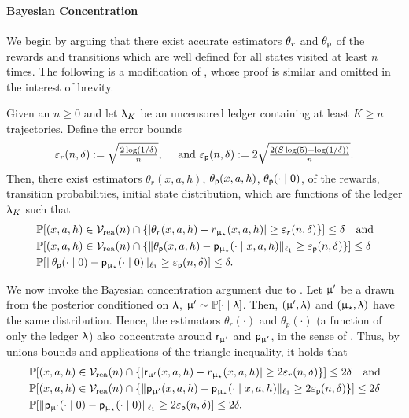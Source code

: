 \paragraph{Bayesian Concentration}
We begin by arguing that there exist accurate estimators $\theta_r$ and $\theta_{\mathsf{p}}$ of the rewards and transitions which are well defined for all states visited at least $n$ times. The following is a modification of , whose proof is similar and omitted in the interest of brevity.
\begin{lemma}\label{lem:conc_bounds_two} Given an $n \ge 0$ and let $\uplambda_K$ be an uncensored ledger containing at least $K \ge n$ trajectories. Define the error bounds
\begin{align*}
\textstyle \varepsilon_{r}(n,\delta) := \sqrt{ \frac{2\log(1/\delta)}{n}}, \quad \text{ and } \varepsilon_{\mathsf{p}}(n,\delta):= 2\sqrt{ \frac{2(S\log(5) + \log(1/\delta))}{n}}.
\end{align*}
Then, there exist estimators $\theta_r(x,a,h)$, $\theta_{\mathsf{p}}(x,a,h)$, $\theta_{\mathsf{p}}(\cdot \mid 0)$,  of the rewards,  transition probabilities, initial state distribution, which are functions of the ledger $\uplambda_K$  such that
\begin{align*}
&\operatorname{\mathbb{P}}[(x,a,h) \in \mathcal{V}_{\mathrm{rea}}(n) \cap \{|\theta_r(x,a,h) - r_{\upmu_{\star}}(x,a,h)| \ge \varepsilon_{r}(n,\delta)\} ] \le \delta \quad \text{and}\\
&\operatorname{\mathbb{P}}[(x,a,h) \in \mathcal{V}_{\mathrm{rea}}(n) \cap \{\|\theta_{\mathsf{p}}(x,a,h) - \mathsf{p}_{\upmu_{\star}}(\cdot \mid x,a,h)\|_{\ell_1} \ge \varepsilon_{\mathsf{p}}(n,\delta)\} ] \le \delta\\
&\operatorname{\mathbb{P}}[\|\theta_{\mathsf{p}}(\cdot \mid 0) - \mathsf{p}_{\upmu_{\star}}(\cdot \mid 0)\|_{\ell_1} \ge \varepsilon_{\mathsf{p}}(n,\delta)] \le \delta.
\end{align*}
\end{lemma}
We now invoke the Bayesian concentration argument due to \cite{Selke-PoIE-ec21}. Let $\upmu'$ be a drawn from the posterior conditioned on $\uplambda$, $\upmu' \sim \operatorname{\mathbb{P}}[\cdot \mid \uplambda]$. Then, $(\upmu',\uplambda)$ and $(\upmu_{\star},\uplambda)$ have the same distribution. Hence, the estimators $\theta_r(\cdot)$ and $\theta_p(\cdot)$ (a function of only the ledger $\uplambda$) also concentrate around $\mathsf{r}_{\upmu'}$ and $\mathsf{p}_{\upmu'}$, in the sense of . Thus, by unions bounds and applications of the triangle inequality, it holds that
\begin{align*}
&\operatorname{\mathbb{P}}[(x,a,h) \in \mathcal{V}_{\mathrm{rea}}(n)\cap \{|\mathsf{r}_{\upmu'}(x,a,h) - r_{\upmu_{\star}}(x,a,h)| \ge 2\varepsilon_{r}(n,\delta)\} ] \le 2\delta \quad \text{and}\\
&\operatorname{\mathbb{P}}[(x,a,h) \in \mathcal{V}_{\mathrm{rea}}(n) \cap \{\|\mathsf{p}_{\upmu'}(x,a,h) - \mathsf{p}_{\upmu_{\star}}(\cdot \mid x,a,h)\|_{\ell_1} \ge 2\varepsilon_{\mathsf{p}}(n,\delta)\} ] \le 2\delta\\
&\operatorname{\mathbb{P}}[\|\mathsf{p}_{\upmu'}(\cdot \mid 0) - \mathsf{p}_{\upmu_{\star}}(\cdot \mid 0)\|_{\ell_1} \ge 2\varepsilon_{\mathsf{p}}(n,\delta)] \le 2\delta.
\end{align*}
